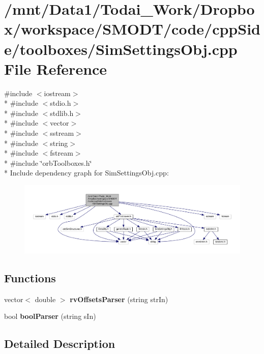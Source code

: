 \section{/mnt/\-Data1/\-Todai\-\_\-\-Work/\-Dropbox/workspace/\-S\-M\-O\-D\-T/code/cpp\-Side/toolboxes/\-Sim\-Settings\-Obj.cpp File Reference}
\label{_sim_settings_obj_8cpp}
{\ttfamily \#include $<$iostream$>$}\\*
{\ttfamily \#include $<$stdio.\-h$>$}\\*
{\ttfamily \#include $<$stdlib.\-h$>$}\\*
{\ttfamily \#include $<$vector$>$}\\*
{\ttfamily \#include $<$sstream$>$}\\*
{\ttfamily \#include $<$string$>$}\\*
{\ttfamily \#include $<$fstream$>$}\\*
{\ttfamily \#include \char`\"{}orb\-Toolboxes.\-h\char`\"{}}\\*
Include dependency graph for Sim\-Settings\-Obj.\-cpp\-:\nopagebreak
\begin{figure}[H]
\begin{center}
\leavevmode
\includegraphics[width=350pt]{_sim_settings_obj_8cpp__incl}
\end{center}
\end{figure}
\subsection*{Functions}
\begin{DoxyCompactItemize}
\item 
vector$<$ double $>$ {\bf rv\-Offsets\-Parser} (string str\-In)
\item 
bool {\bf bool\-Parser} (string s\-In)
\end{DoxyCompactItemize}


\subsection{Detailed Description}


